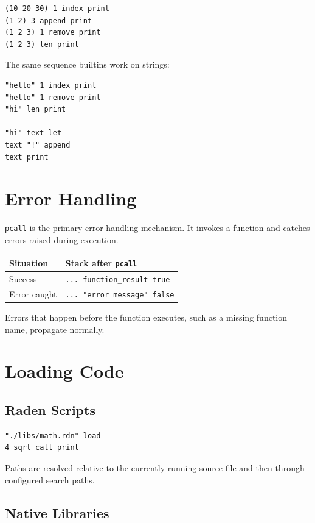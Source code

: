 \documentclass[11pt,a4paper]{article}
\newcommand{\code}[1]{\texttt{#1}}
\begin{document}
\begin{lstlisting}[language=Raden]
(10 20 30) 1 index print
(1 2) 3 append print
(1 2 3) 1 remove print
(1 2 3) len print
\end{lstlisting}

The same sequence builtins work on strings:

\begin{lstlisting}[language=Raden]
"hello" 1 index print
"hello" 1 remove print
"hi" len print

"hi" text let
text "!" append
text print
\end{lstlisting}

\section{Error Handling}

\code{pcall} is the primary error-handling mechanism. It invokes a
function and catches errors raised during execution.

\begin{longtable}{ll}
\toprule
Situation & Stack after \code{pcall} \\
\midrule
Success & \code{... function\_result true} \\
Error caught & \code{... "error message" false} \\
\bottomrule
\end{longtable}

Errors that happen before the function executes, such as a missing
function name, propagate normally.

\section{Loading Code}

\subsection{Raden Scripts}

\begin{lstlisting}[language=Raden]
"./libs/math.rdn" load
4 sqrt call print
\end{lstlisting}

Paths are resolved relative to the currently running source file and then
through configured search paths.

\subsection{Native Libraries}
\end{document}

